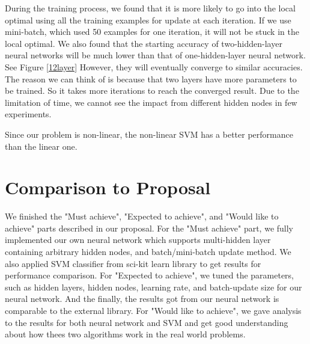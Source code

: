 \documentclass[11pt,letterpaper]{article}
\begin{document}
During the training process, we found that it is more likely to go into the local optimal using all the training examples for update at each iteration. If we use mini-batch, which used 50 examples for one iteration, it will not be stuck in the local optimal. We also found that the starting accuracy of two-hidden-layer neural networks will be much lower than that of one-hidden-layer neural network. See Figure \ref{12layer} However, they will eventually converge to similar accuracies. The reason we can think of is because that two layers have more parameters to be trained. So it takes more iterations to reach the converged result. Due to the limitation of time, we cannot see the impact from different hidden nodes in few experiments.

Since our problem is non-linear, the non-linear SVM has a better performance than the linear one.





\section{Comparison to Proposal}
We finished the "Must achieve", "Expected to achieve", and "Would like to achieve" parts described in our proposal. For the "Must achieve" part, we fully implemented our own neural network which supports multi-hidden layer containing arbitrary hidden nodes, and batch/mini-batch update method. We also applied SVM classifier from sci-kit learn library to get results for performance comparison. For "Expected to achieve", we tuned the parameters, such as hidden layers, hidden nodes, learning rate, and batch-update size for our neural network. And the finally, the results got from our neural network is comparable to the external library. For "Would like to achieve", we gave analysis to the results for both neural network and SVM and get good understanding about how thees two algorithms work in the real world problems.
\end{document}
